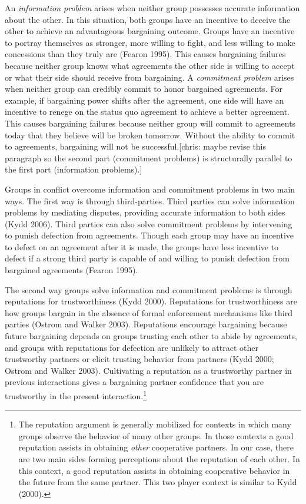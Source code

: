 \documentclass[11pt]{article}
\begin{document}
An \emph{information problem} arises when neither group possesses
accurate information about the other. In this situation, both groups
have an incentive to deceive the other to achieve an advantageous
bargaining outcome. Groups have an incentive to portray themselves as
stronger, more willing to fight, and less willing to make concessions
than they truly are (Fearon 1995). This causes bargaining failures
because neither group knows what agreements the other side is willing to
accept or what their side should receive from bargaining. A
\emph{commitment problem} arises when neither group can credibly commit
to honor bargained agreements. For example, if bargaining power shifts
after the agreement, one side will have an incentive to renege on the
status quo agreement to achieve a better agreement. This causes
bargaining failures because neither group will commit to agreements
today that they believe will be broken tomorrow. Without the ability to
commit to agreements, bargaining will not be successful.{[}chris: maybe
revise this paragraph so the second part (commitment problems) is
structurally parallel to the first part (information problems).{]}

Groups in conflict overcome information and commitment problems in two
main ways. The first way is through third-parties. Third parties can
solve information problems by mediating disputes, providing accurate
information to both sides (Kydd 2006). Third parties can also solve
commitment problems by intervening to punish defection from agreements.
Though each group may have an incentive to defect on an agreement after
it is made, the groups have less incentive to defect if a strong third
party is capable of and willing to punish defection from bargained
agreements (Fearon 1995).

The second way groups solve information and commitment problems is
through reputations for trustworthiness (Kydd 2000). Reputations for
trustworthiness are how groups bargain in the absence of formal
enforcement mechanisms like third parties (Ostrom and Walker 2003).
Reputations encourage bargaining because future bargaining depends on
groups trusting each other to abide by agreements, and groups with
reputations for defection are unlikely to attract other trustworthy
partners or elicit trusting behavior from partners (Kydd 2000; Ostrom
and Walker 2003). Cultivating a reputation as a trustworthy partner in
previous interactions gives a bargaining partner confidence that you are
trustworthy in the present interaction.\footnote{The reputation argument
  is generally mobilized for contexts in which many groups observe the
  behavior of many other groups. In those contexts a good reputation
  assists in obtaining \emph{other} cooperative partners. In our case,
  there are two main sides forming perceptions about the reputation of
  each other. In this context, a good reputation assists in obtaining
  cooperative behavior in the future from the same partner. This two
  player context is similar to Kydd (2000).}
\end{document}
